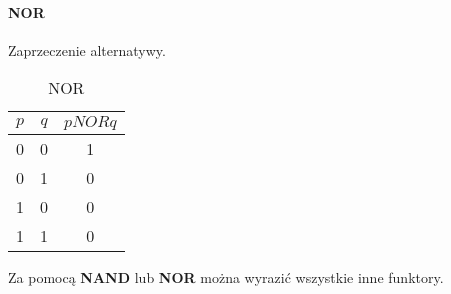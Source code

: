         \paragraph{NOR}
        Zaprzeczenie alternatywy. 
        \begin{table}[h!]
            \begin{center}
                \caption{NOR}
                \label{tab:tabela7}
                \begin{tabular}{c|c|c}
                    \textbf{$p$} & \textbf{$q$} & \textbf{$p NOR q$} \\
                    \midrule
                    0 & 0 & 1\\
                    0 & 1 & 0\\
                    1 & 0 & 0\\
                    1 & 1 & 0\\
                    \bottomrule
                \end{tabular}
            \end{center}
        \end{table}
        
        \begin{theorem}
            Za pomocą \textbf{NAND} lub \textbf{NOR} można wyrazić wszystkie inne funktory.
        \end{theorem}
    
